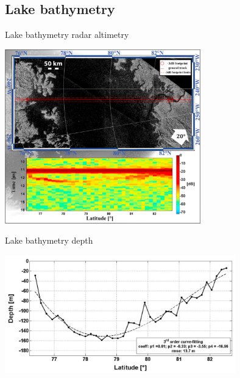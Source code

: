 \documentclass[xcolor=dvipsnames,beamer]{beamer} %
\begin{document}
\subsection{Lake bathymetry}
\begin{frame}[fragile]{Lake bathymetry radar altimetry}

\begin{center}
  \includegraphics[width=8.5cm]{images/Mastrogiuseppe2}
\end{center}
\end{frame}

\begin{frame}[fragile]{Lake bathymetry depth}

\begin{center}
  \includegraphics[width=10cm]{images/MastrogiuseppeLigeiaMare}
\end{center}
\end{frame}
\end{document}
